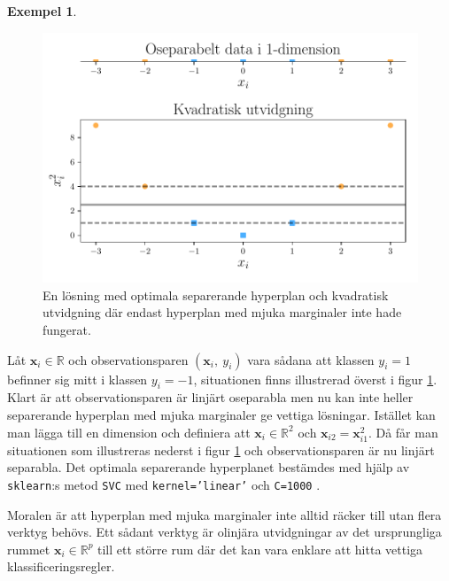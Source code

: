 \documentclass[a4paper, 12pt]{report}
\theoremstyle{definition}
\newtheorem{ex}{Exempel}[section]
\theoremstyle{remark}
\begin{document}
\begin{ex}\label{ex:olinjär}
\begin{figure}[h]
	\centering
	\includegraphics[width=\linewidth, trim={0.2cm 4mm -7mm 3.5mm}, clip]{KandFigur3.pdf}
	\caption{\label{fig:kvadratisk}En lösning med optimala separerande hyperplan och kvadratisk utvidgning där endast hyperplan med mjuka marginaler inte hade fungerat.}
\end{figure}
Låt $\mathbf{x}_i\in\mathbb{R}$ och observationsparen $\left(\mathbf{x}_i,~y_i\right)$ vara sådana att klassen $y_i=1$ befinner sig mitt i klassen $y_i=-1$, situationen finns illustrerad överst i figur \ref{fig:kvadratisk}. Klart är att observationsparen är linjärt oseparabla men nu kan inte heller separerande hyperplan med mjuka marginaler ge vettiga lösningar. Istället kan man lägga till en dimension och definiera att $\mathbf{x}_i\in\mathbb{R}^2$ och $\mathbf{x}_{i2} = \mathbf{x}_{i1}^2$.
Då får man situationen som illustreras nederst i figur \ref{fig:kvadratisk} och observationsparen är nu linjärt separabla. Det optimala separerande hyperplanet bestämdes med hjälp av \texttt{sklearn}:s metod \texttt{SVC} med \texttt{kernel='linear'} och \texttt{C=1000} \cite{sklearn}.

Moralen är att hyperplan med mjuka marginaler inte alltid räcker till utan flera verktyg behövs. Ett sådant verktyg är olinjära utvidgningar av det ursprungliga rummet $\mathbf{x}_i\in \mathbb{R}^p$ till ett större rum där det kan vara enklare att hitta vettiga klassificeringsregler.
\end{ex}

\FloatBarrier
\end{document}
